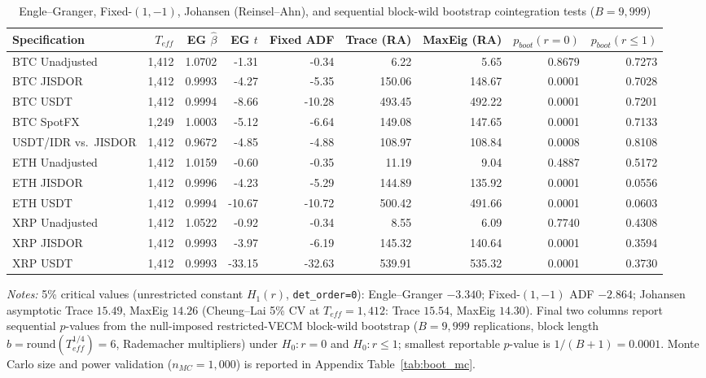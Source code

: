 \begin{table}[htbp]
\centering
\caption{Engle--Granger, Fixed-$(1,-1)$, Johansen (Reinsel--Ahn), and sequential block-wild bootstrap cointegration tests ($B=9,999$)}
\label{tab:cointegration}
\fontsize{6.3}{7.6}\selectfont\setlength{\tabcolsep}{1.6pt}
\begingroup
\begin{tabular}{@{}>{\raggedright\arraybackslash}p{2.7cm}rrrrrrrr@{}}
\toprule
Specification & $T_{eff}$ & EG $\hat{\beta}$ & EG $t$ & Fixed ADF & Trace (RA) & MaxEig (RA) & $p_{boot}(r=0)$ & $p_{boot}(r\le 1)$ \\
\midrule
BTC Unadjusted & 1,412 & 1.0702 & -1.31 & -0.34 & 6.22 & 5.65 & 0.8679 & 0.7273 \\
BTC JISDOR & 1,412 & 0.9993 & -4.27 & -5.35 & 150.06 & 148.67 & 0.0001 & 0.7028 \\
BTC USDT & 1,412 & 0.9994 & -8.66 & -10.28 & 493.45 & 492.22 & 0.0001 & 0.7201 \\
BTC SpotFX & 1,249 & 1.0003 & -5.12 & -6.64 & 149.08 & 147.65 & 0.0001 & 0.7133 \\
USDT/IDR vs.\ JISDOR & 1,412 & 0.9672 & -4.85 & -4.88 & 108.97 & 108.84 & 0.0008 & 0.8108 \\
ETH Unadjusted & 1,412 & 1.0159 & -0.60 & -0.35 & 11.19 & 9.04 & 0.4887 & 0.5172 \\
ETH JISDOR & 1,412 & 0.9996 & -4.23 & -5.29 & 144.89 & 135.92 & 0.0001 & 0.0556 \\
ETH USDT & 1,412 & 0.9994 & -10.67 & -10.72 & 500.42 & 491.66 & 0.0001 & 0.0603 \\
XRP Unadjusted & 1,412 & 1.0522 & -0.92 & -0.34 & 8.55 & 6.09 & 0.7740 & 0.4308 \\
XRP JISDOR & 1,412 & 0.9993 & -3.97 & -6.19 & 145.32 & 140.64 & 0.0001 & 0.3594 \\
XRP USDT & 1,412 & 0.9993 & -33.15 & -32.63 & 539.91 & 535.32 & 0.0001 & 0.3730 \\
\bottomrule
\end{tabular}\endgroup
\begin{minipage}{\textwidth}\footnotesize\vspace{3pt}
\emph{Notes:} 5\% critical values (unrestricted constant $H_1(r)$, \texttt{det\_order=0}): Engle--Granger $-3.340$; Fixed-$(1,-1)$ ADF $-2.864$; Johansen asymptotic Trace $15.49$, MaxEig $14.26$ (Cheung--Lai 5\% CV at $T_{eff}=1,412$: Trace $15.54$, MaxEig $14.30$). Final two columns report sequential $p$-values from the null-imposed restricted-VECM block-wild bootstrap ($B=9,999$ replications, block length $b = \mathrm{round}(T_{eff}^{1/4}) = 6$, Rademacher multipliers) under $H_0: r=0$ and $H_0: r\le 1$; smallest reportable $p$-value is $1/(B+1) = 0.0001$. Monte Carlo size and power validation ($n_{MC}=1,000$) is reported in Appendix Table~\ref{tab:boot_mc}.
\end{minipage}
\end{table}
